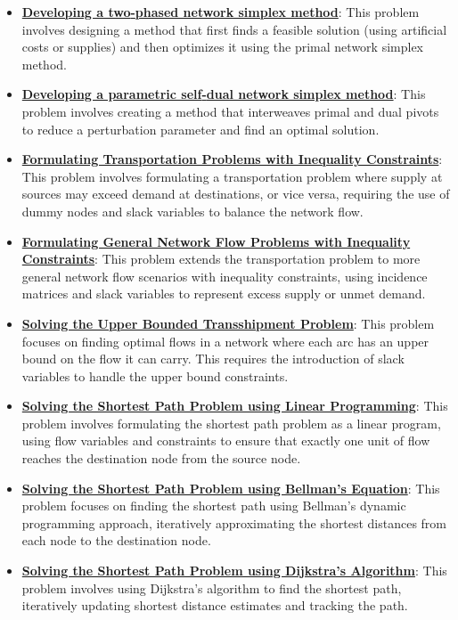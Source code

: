 \documentclass{article}%
\begin{document}
\begin{itemize}[leftmargin=*]
\item \href{https://www.math.purdue.edu/~yipn/421//2024-11-07-NetSimplex.pdf#page=45}{\textbf{Developing a two{-}phased network simplex method}}: This problem involves designing a method that first finds a feasible solution (using artificial costs or supplies) and then optimizes it using the primal network simplex method.%
\item \href{https://www.math.purdue.edu/~yipn/421//2024-11-07-NetSimplex.pdf#page=45}{\textbf{Developing a parametric self{-}dual network simplex method}}: This problem involves creating a method that interweaves primal and dual pivots to reduce a perturbation parameter and find an optimal solution.%
\end{itemize}%
\begin{itemize}[leftmargin=*]%
\item \href{https://www.math.purdue.edu/~yipn/421//2024-11-14-NetAppls.pdf#page=2}{\textbf{Formulating Transportation Problems with Inequality Constraints}}: This problem involves formulating a transportation problem where supply at sources may exceed demand at destinations, or vice versa, requiring the use of dummy nodes and slack variables to balance the network flow.%
\item \href{https://www.math.purdue.edu/~yipn/421//2024-11-14-NetAppls.pdf#page=7}{\textbf{Formulating General Network Flow Problems with Inequality Constraints}}: This problem extends the transportation problem to more general network flow scenarios with inequality constraints, using incidence matrices and slack variables to represent excess supply or unmet demand.%
\item \href{https://www.math.purdue.edu/~yipn/421//2024-11-14-NetAppls.pdf#page=9}{\textbf{Solving the Upper Bounded Transshipment Problem}}: This problem focuses on finding optimal flows in a network where each arc has an upper bound on the flow it can carry.  This requires the introduction of slack variables to handle the upper bound constraints.%
\item \href{https://www.math.purdue.edu/~yipn/421//2024-11-14-NetAppls.pdf#page=13}{\textbf{Solving the Shortest Path Problem using Linear Programming}}: This problem involves formulating the shortest path problem as a linear program, using flow variables and constraints to ensure that exactly one unit of flow reaches the destination node from the source node.%
\item \href{https://www.math.purdue.edu/~yipn/421//2024-11-14-NetAppls.pdf#page=16}{\textbf{Solving the Shortest Path Problem using Bellman's Equation}}: This problem focuses on finding the shortest path using Bellman's dynamic programming approach, iteratively approximating the shortest distances from each node to the destination node.%
\item \href{https://www.math.purdue.edu/~yipn/421//2024-11-14-NetAppls.pdf#page=20}{\textbf{Solving the Shortest Path Problem using Dijkstra's Algorithm}}: This problem involves using Dijkstra's algorithm to find the shortest path, iteratively updating shortest distance estimates and tracking the path.%
\end{itemize}%
\end{document}
